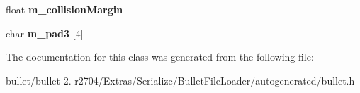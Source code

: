 \begin{DoxyCompactItemize}
\item 
\hypertarget{class_bullet_1_1bt_triangle_mesh_shape_data_aabce5e9bccaa79fb857630f6c43da968}{float {\bfseries m\+\_\+collision\+Margin}}\label{class_bullet_1_1bt_triangle_mesh_shape_data_aabce5e9bccaa79fb857630f6c43da968}

\item 
\hypertarget{class_bullet_1_1bt_triangle_mesh_shape_data_a47ba9ea440f94327b2bbaf97552b6de1}{char {\bfseries m\+\_\+pad3} \mbox{[}4\mbox{]}}\label{class_bullet_1_1bt_triangle_mesh_shape_data_a47ba9ea440f94327b2bbaf97552b6de1}

\end{DoxyCompactItemize}


The documentation for this class was generated from the following file\+:\begin{DoxyCompactItemize}
\item 
bullet/bullet-\/2.-\/r2704/\+Extras/\+Serialize/\+Bullet\+File\+Loader/autogenerated/bullet.\+h\end{DoxyCompactItemize}
